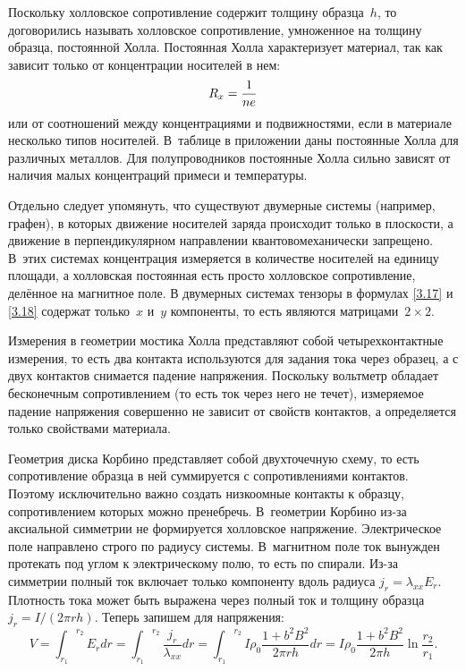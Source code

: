 Поскольку холловское сопротивление содержит толщину образца~$h$, то договорились
называть холловское сопротивление, умноженное на толщину образца, постоянной
Холла. Постоянная Холла характеризует материал, так как зависит только от
концентрации носителей в нем:
\begin{equation}
	R_x=\frac{1}{ne}
	\eqmark{HallConstant}
\end{equation}
или от соотношений между концентрациями и подвижностями, если в материале
несколько типов носителей. В~таблице в приложении даны постоянные Холла для
различных металлов. Для полупроводников постоянные Холла сильно зависят от
наличия малых концентраций примеси и температуры.

Отдельно следует упомянуть, что существуют двумерные системы (например, графен),
в которых движение носителей заряда происходит только в плоскости, а движение в
перпендикулярном направлении квантовомеханически запрещено. В~этих системах
концентрация измеряется в количестве носителей на единицу площади, а холловская
постоянная есть просто холловское сопротивление, делённое на магнитное поле. В
двумерных системах тензоры в формулах \eqref{3.17} и \eqref{3.18} содержат
только~$x$ и~$y$ компоненты, то есть являются матрицами~$2\times2$.

Измерения в геометрии мостика Холла представляют собой четырехконтактные
измерения, то есть два контакта используются для задания тока через образец, а с
двух контактов снимается падение напряжения. Поскольку вольтметр обладает
бесконечным сопротивлением (то есть ток через него не течет), измеряемое падение
напряжения совершенно не зависит от свойств контактов, а определяется только
свойствами материала.

Геометрия диска Корбино представляет собой двухточечную схему, то есть
сопротивление образца в ней суммируется с сопротивлениями контактов. Поэтому
исключительно важно создать низкоомные контакты к образцу, сопротивлением
которых можно пренебречь. В~геометрии Корбино из-за аксиальной симметрии не
формируется холловское напряжение. Электрическое поле направлено строго по
радиусу системы. В~магнитном поле ток вынужден протекать под углом к
электрическому полю, то есть по спирали. Из-за симметрии полный ток включает
только компоненту вдоль радиуса $j_r=\lambda_{xx} E_r$. Плотность тока может
быть выражена через полный ток и толщину образца $j_r=I/(2\pi rh)$.
Теперь запишем для напряжения:
\begin{equation*}
V={\int_{r_1}}^{r_2}E_r dr={\int_{r_1}}^{r_2}\frac{j_r}{\lambda_{xx}}
dr={\int_{r_1}}^{r_2}I\rho_0\frac{1+b^2B^2}{2\pi
rh}dr=I\rho_0\frac{1+b^2B^2}{2\pi h}\ln{\frac{r_2}{r_1}}.
\end{equation*}

